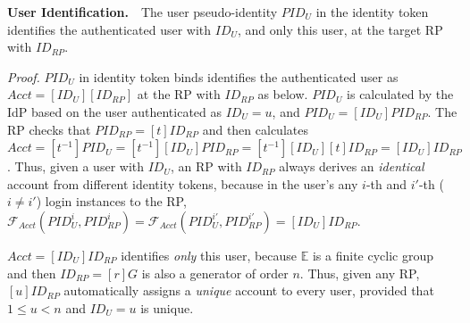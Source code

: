 \vspace{1mm}
\noindent\textbf{User Identification.}~~The user pseudo-identity $PID_U$ in the identity token identifies
        the authenticated user with $ID_U$,%
         and only this user,  at the target RP with $ID_{RP}$.

\vspace{0.5mm}
\noindent\emph{Proof.}
$PID_U$ in identity token binds identifies the authenticated user as $Acct = [ID_U][ID_{RP}]$
    at the RP with $ID_{RP}$ as below.
$PID_U$ is calculated by the IdP based on the user authenticated as $ID_U = u$,
    and $PID_U = [ID_U]PID_{RP}$.
The  RP checks that $PID_{RP} = [t]ID_{RP}$ 
    and then calculates $Acct = [t^{-1}]PID_U = [t^{-1}][ID_U]PID_{RP} = [t^{-1}][ID_U][t]ID_{RP} = [ID_U]ID_{RP}$.
Thus, given a user with $ID_U$, an RP with $ID_{RP}$ always derives an \emph{identical} account from different identity tokens, %
because in the user's any $i$-th and $i'$-th ($i \neq i'$) login instances to the RP,
 $\mathcal{F}_{Acct}(PID_{U}^i, PID_{RP}^i) = \mathcal{F}_{Acct}(PID_{U}^{i'}, PID_{RP}^{i'}) = [ID_U]ID_{RP}$.

$Acct =  [ID_U]ID_{RP}$ identifies \emph{only} this user,
    because 
$\mathbb{E}$ is a finite cyclic group
    and then $ID_{RP} = [r]G$ is also a generator of order $n$.
Thus, given any RP,
    $[u]ID_{RP}$ automatically assigns a \emph{unique} account to every user,
        provided that $1 \leq u < n$ and $ID_U = u$ is unique.





